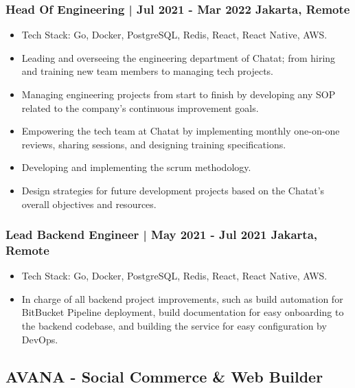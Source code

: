 \documentclass[11pt]{article}
\begin{document}
\subsubsection{Head Of Engineering | Jul 2021 - Mar 2022 \hfill Jakarta, Remote}
\begin{itemize}
    \item Tech Stack: Go, Docker, PostgreSQL, Redis, React, React Native, AWS.
    \item Leading and overseeing the engineering department of Chatat; from hiring and training new team
          members to managing tech projects.
    \item Managing engineering projects from start to finish by developing any SOP related to the company's
          continuous improvement goals.
    \item Empowering the tech team at Chatat by implementing monthly one-on-one reviews, sharing
          sessions, and designing training specifications.
    \item Developing and implementing the scrum methodology.
    \item Design strategies for future development projects based on the Chatat’s overall objectives and
          resources.
\end{itemize}
\subsubsection{Lead Backend Engineer | May 2021 - Jul 2021 \hfill Jakarta, Remote}
\begin{itemize}
    \item Tech Stack: Go, Docker, PostgreSQL, Redis, React, React Native, AWS.
    \item In charge of all backend project improvements, such as build automation for BitBucket Pipeline
          deployment, build documentation for easy onboarding to the backend codebase, and building the service
          for easy configuration by DevOps.
\end{itemize}

\subsection{AVANA - Social Commerce \& Web Builder}
\end{document}
